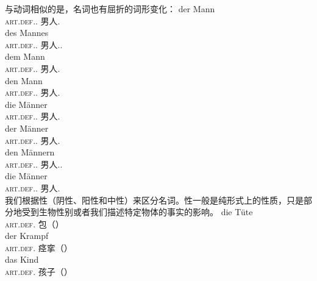 与动词相似的是，名词也有屈折的词形变化：
\eal
\ex 
\gll der                 Mann\\
     \textsc{art}.\textsc{def}.\nom.\sg{} 男人.\sg\\
\ex 
\gll des                 Mannes\\
     \textsc{art}.\textsc{def}.\gen.\sg{} 男人.\gen.\sg\\
\ex 
\gll dem                 Mann\\
     \textsc{art}.\textsc{def}.\dat.\sg{} 男人.\sg\\
\ex 
\gll den                 Mann\\
   \textsc{art}.\textsc{def}.\acc.\sg{} 男人.\sg\\
\ex 
\gll die                     Männer\\
     \textsc{art}.\textsc{def}.\nom.\pl{} 男人.\pl\\
\ex 
\gll der                     Männer\\
     \textsc{art}.\textsc{def}.\gen.\pl{} 男人.\pl\\
\ex 
\gll den                     Männern\\
     \textsc{art}.\textsc{def}.\dat.\pl{} 男人.\dat.\pl\\
\ex 
\gll die                     Männer\\
     \textsc{art}.\textsc{def}.\acc.\pl{} 男人.\pl\\
\zl
我们根据性（阴性、阳性和中性）来区分名词。性一般是纯形式上的性质，只是部分地受到生物性别或者我们描述特定物体的事实的影响。
\eal
\ex
\gll die Tüte\\
	 \textsc{art}.\textsc{def}.\fem{} 包（\fem）\\
\ex 
\gll der Krampf\\
	 \textsc{art}.\textsc{def}.\mas{} 痉挛（\mas）\\
\ex 
\gll das Kind\\
	 \textsc{art}.\textsc{def}.\neu{} 孩子（\neu）\\
\zl

